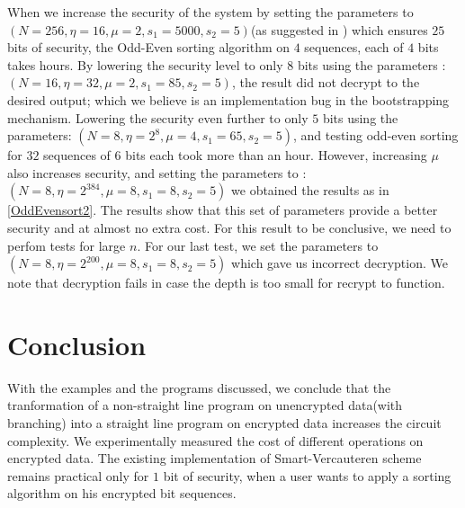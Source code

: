 \documentclass{acm_proc_article-sp}
\begin{document}
\begin{table}
\caption{Wall time for Odd-Even Merge Sort with increased security}
\end{table}

When we increase the security of the system by setting the parameters to  $(N = 256,\eta  = 16, \mu = 2, s_1 = 5000, s_2 = 5)$(as suggested in \cite{cryptoeprint:2009:571}) which ensures $25$ bits of security, the Odd-Even sorting algorithm on  $4$ sequences, each of $4$ bits takes hours. By lowering the security level to only $8$ bits using the parameters :$(N = 16, \eta = 32, \mu = 2, s_1 = 85, s_2 = 5)$, the result did not decrypt to the desired output; which we believe is an implementation bug in the bootstrapping mechanism. Lowering the security even further to only $5$ bits using the parameters: $(N = 8, \eta = 2^8, \mu = 4, s_1 = 65, s_2 = 5)$, and testing odd-even sorting for $32$ sequences of $6$ bits each took more than an hour. However, increasing $\mu$ also increases security, and setting the parameters to :  $(N = 8, \eta = 2^{384}, \mu = 8, s_1 = 8, s_2 = 5)$ we obtained the results as in \autoref{OddEvensort2}. The results show that this set of parameters provide a better security and at almost no extra cost. For this result to be conclusive, we need to perfom tests for large $n$. For our last test, we set the parameters to  $(N = 8, \eta = 2^{200}, \mu = 8, s_1 = 8, s_2 = 5)$ which gave us incorrect decryption. We note that decryption fails in case the depth is too small for recrypt to function.

\section{Conclusion}
With the examples and the programs discussed, we conclude that the tranformation of a non-straight line program on unencrypted data(with branching) into a straight line program on encrypted data increases the circuit complexity. We experimentally measured the cost of different operations on encrypted data. The existing implementation of Smart-Vercauteren scheme remains practical only for $1$ bit of security, when a user wants to apply a sorting algorithm on his encrypted bit sequences.      


  
\balancecolumns
\end{document}
